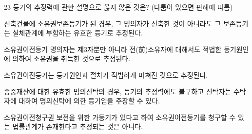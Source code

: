\begin{question}{23}
등기의 추정력에 관한 설명으로 옳지 않은 것은? (다툼이 있으면 판례에 따름)
\begin{choices}
  \item 신축건물에 소유권보존등기가 된 경우, 그 명의자가 신축한 것이 아니라도 그 보존등기는 실체관계에 부합하는 유효한 등기로 추정된다.
  \item 소유권이전등기 명의자는 제3자뿐만 아니라 전(前)소유자에 대해서도 적법한 등기원인에 의하여 소유권을 취득한 것으로 추정된다.
  \item 소유권이전등기는 등기원인과 절차가 적법하게 마쳐진 것으로 추정된다.
  \item 종중재산에 대한 유효한 명의신탁의 경우, 등기의 추정력에도 불구하고 신탁자는 수탁자에 대하여 명의신탁에 의한 등기임을 주장할 수 있다.
  \item 소유권이전청구권 보전을 위한 가등기가 있다고 하여 소유권이전등기를 청구할 수 있는 법률관계가 존재한다고 추정되는 것은 아니다.
\end{choices}
\end{question}
